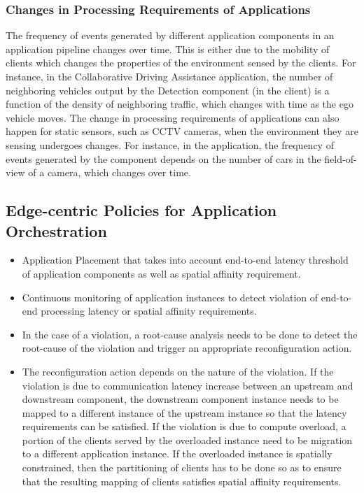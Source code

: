 \subsubsection{Changes in Processing Requirements of Applications}
The frequency of events generated by different application components in an application pipeline changes over time. This is either due to the mobility of clients which changes the properties of the environment sensed by the clients. For instance, in the Collaborative Driving Assistance application, the number of neighboring vehicles output by the Detection component (in the client) is a function of the density of neighboring traffic, which changes with time as the ego vehicle moves. The change in processing requirements of applications can also happen for static sensors, such as CCTV cameras, when the environment they are sensing undergoes changes. For instance, in the \todo{} application, the frequency of events generated by the \todo{} component depends on the number of cars in the field-of-view of a camera, which changes over time.

\subsection{Edge-centric Policies for Application Orchestration}

\begin{itemize}
\item Application Placement that takes into account end-to-end latency threshold of application components as well as spatial affinity requirement.
\item Continuous monitoring of application instances to detect violation of end-to-end processing latency or spatial affinity requirements.
\item In the case of a violation, a root-cause analysis needs to be done to detect the root-cause of the violation and trigger an appropriate reconfiguration action.
\item The reconfiguration action depends on the nature of the violation. If the violation is due to communication latency increase between an upstream and downstream component, the downstream component instance needs to be mapped to a different instance of the upstream instance so that the latency requirements can be satisfied. If the violation is due to compute overload, a portion of the clients served by the overloaded instance need to be migration to a different application instance. If the overloaded instance is spatially constrained, then the partitioning of clients has to be done so as to ensure that the resulting mapping of clients satisfies spatial affinity requirements.
\end{itemize}

